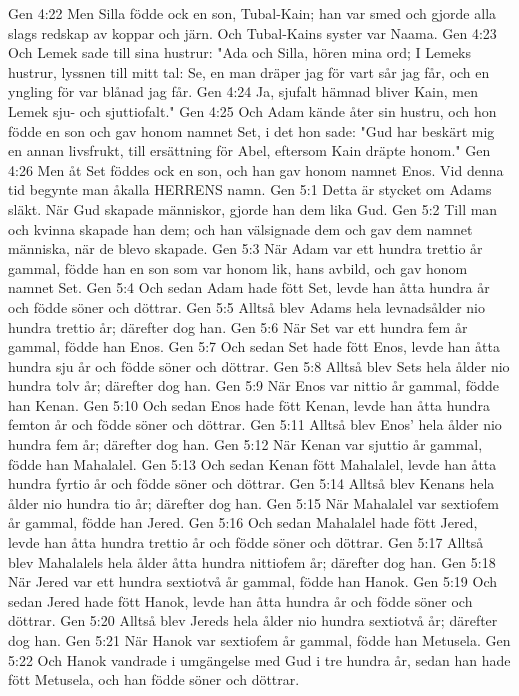 Gen 4:22  Men Silla födde ock en son, Tubal-Kain; han var smed och gjorde alla slags redskap av koppar och järn. Och Tubal-Kains syster var Naama.
Gen 4:23  Och Lemek sade till sina hustrur: "Ada och Silla, hören mina ord; I Lemeks hustrur, lyssnen till mitt tal: Se, en man dräper jag för vart sår jag får, och en yngling för var blånad jag får.
Gen 4:24  Ja, sjufalt hämnad bliver Kain, men Lemek sju- och sjuttiofalt."
Gen 4:25  Och Adam kände åter sin hustru, och hon födde en son och gav honom namnet Set, i det hon sade: "Gud har beskärt mig en annan livsfrukt, till ersättning för Abel, eftersom Kain dräpte honom."
Gen 4:26  Men åt Set föddes ock en son, och han gav honom namnet Enos. Vid denna tid begynte man åkalla HERRENS namn.
Gen 5:1  Detta är stycket om Adams släkt. När Gud skapade människor, gjorde han dem lika Gud.
Gen 5:2  Till man och kvinna skapade han dem; och han välsignade dem och gav dem namnet människa, när de blevo skapade.
Gen 5:3  När Adam var ett hundra trettio år gammal, födde han en son som var honom lik, hans avbild, och gav honom namnet Set.
Gen 5:4  Och sedan Adam hade fött Set, levde han åtta hundra år och födde söner och döttrar.
Gen 5:5  Alltså blev Adams hela levnadsålder nio hundra trettio år; därefter dog han.
Gen 5:6  När Set var ett hundra fem år gammal, födde han Enos.
Gen 5:7  Och sedan Set hade fött Enos, levde han åtta hundra sju år och födde söner och döttrar.
Gen 5:8  Alltså blev Sets hela ålder nio hundra tolv år; därefter dog han.
Gen 5:9  När Enos var nittio år gammal, födde han Kenan.
Gen 5:10  Och sedan Enos hade fött Kenan, levde han åtta hundra femton år och födde söner och döttrar.
Gen 5:11  Alltså blev Enos' hela ålder nio hundra fem år; därefter dog han.
Gen 5:12  När Kenan var sjuttio år gammal, födde han Mahalalel.
Gen 5:13  Och sedan Kenan fött Mahalalel, levde han åtta hundra fyrtio år och födde söner och döttrar.
Gen 5:14  Alltså blev Kenans hela ålder nio hundra tio år; därefter dog han.
Gen 5:15  När Mahalalel var sextiofem år gammal, födde han Jered.
Gen 5:16  Och sedan Mahalalel hade fött Jered, levde han åtta hundra trettio år och födde söner och döttrar.
Gen 5:17  Alltså blev Mahalalels hela ålder åtta hundra nittiofem år; därefter dog han.
Gen 5:18  När Jered var ett hundra sextiotvå år gammal, födde han Hanok.
Gen 5:19  Och sedan Jered hade fött Hanok, levde han åtta hundra år och födde söner och döttrar.
Gen 5:20  Alltså blev Jereds hela ålder nio hundra sextiotvå år; därefter dog han.
Gen 5:21  När Hanok var sextiofem år gammal, födde han Metusela.
Gen 5:22  Och Hanok vandrade i umgängelse med Gud i tre hundra år, sedan han hade fött Metusela, och han födde söner och döttrar.

